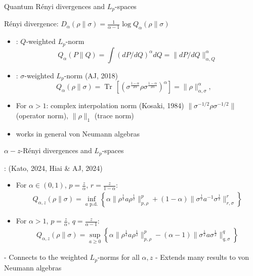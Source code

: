 \documentclass[mathserif]{beamer}
\newcommand{\<}{\langle}
\renewcommand{\>}{\rangle}
\newcommand{\Tr}{\operatorname{Tr}\,}
\begin{document}
\begin{frame}{Quantum R\'enyi divergences and $L_p$-spaces}

R\'enyi divergence: $D_\alpha(\rho\|\sigma)=\frac1{\alpha-1}\log Q_{\alpha}(\rho\|\sigma)$

\bigskip

\begin{itemize}
\item {}: $Q$-weighted $L_p$-norm 
\[
Q_\alpha(P\|Q)=\int \left(dP/dQ\right)^\alpha
dQ=\|dP/dQ\|_{\alpha,Q}^\alpha
\]
\item {}: $\sigma$-weighted $L_p$-norm {\small(AJ, 2018)}
\[
Q_\alpha(\rho\|\sigma)=\Tr\left[\left(
\sigma^{\frac{1-\alpha}{2\alpha}}\rho\sigma^{\frac{1-\alpha}{2\alpha}}\right)^\alpha\right]=\|\rho\|^\alpha_{\alpha,\sigma},\quad
\]
\item For $\alpha>1$: complex interpolation norm {\small (Kosaki, 1984)}
\vskip 3mm
 $\|\sigma^{-1/2}\rho\sigma^{-1/2}\|$ (operator norm),  $\|\rho\|_1$ (trace norm)

\item works in general von Neumann algebras
\end{itemize}


\end{frame}

\begin{frame}{$\alpha-z$-R\'enyi divergences and $L_p$-spaces}

: {\small (Kato, 2024, Hiai \& AJ, 2024)}

\bigskip

\begin{itemize}
\item For $\alpha\in (0,1)$, $p=\frac{z}{\alpha}$, $r=\frac{z}{1-\alpha}$:
\begin{multline*}
Q_{\alpha,z}(\rho\|\sigma)=\inf_{a
\text{ p.d.}}\left\{\alpha\|\rho^{\frac 12}a\rho^{\frac
12}\|^p_{p,\rho}+(1-\alpha)\|\sigma^{\frac 12}a^{-1}\sigma^{\frac 12}\|^r_{r,\sigma}\right\}
\end{multline*}

\item For $\alpha>1$, $p=\frac{z}{\alpha}$, $q=\frac{z}{\alpha-1}$:
\begin{multline*}
Q_{\alpha,z}(\rho\|\sigma)=\sup_{a\ge 0} \left\{\alpha\|\rho^{\frac 12}a\rho^{\frac
12}\|^p_{p,\rho}- (\alpha-1)\|\sigma^{\frac 12}a\sigma^{\frac 12}\|^q_{q,\sigma}
 \right\}
\end{multline*}

\end{itemize}

\medskip

- Connects to the weighted $L_p$-norms for all $\alpha, z$
\vskip 3mm
- Extends many results to von Neumann algebras

\end{frame}
\end{document}
